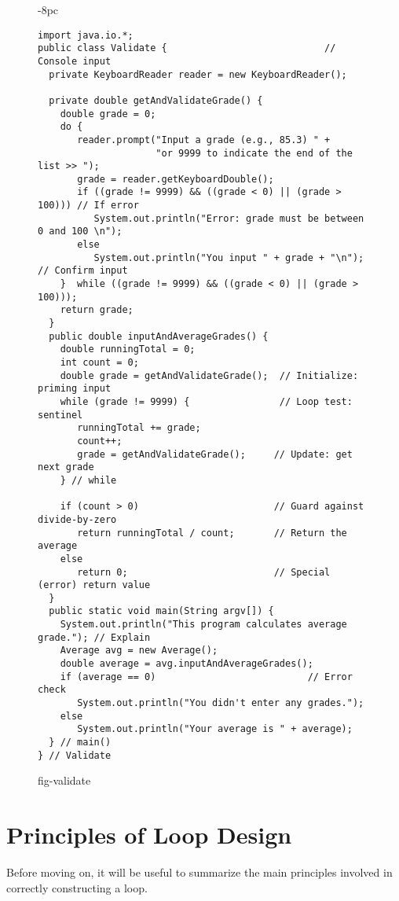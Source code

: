 \begin{figure}[p]
\jjjprogstart
\begin{jjjlistingleft}[34pc]{-8pc}
\begin{lstlisting}
import java.io.*;
public class Validate {                            // Console input
  private KeyboardReader reader = new KeyboardReader();  

  private double getAndValidateGrade() {
    double grade = 0;
    do {
       reader.prompt("Input a grade (e.g., 85.3) " +
                     "or 9999 to indicate the end of the list >> ");
       grade = reader.getKeyboardDouble();
       if ((grade != 9999) && ((grade < 0) || (grade > 100))) // If error
          System.out.println("Error: grade must be between 0 and 100 \n");  
       else
          System.out.println("You input " + grade + "\n");  // Confirm input
    }  while ((grade != 9999) && ((grade < 0) || (grade > 100)));
    return grade;
  }
  public double inputAndAverageGrades() {
    double runningTotal = 0;
    int count = 0;
    double grade = getAndValidateGrade();  // Initialize: priming input
    while (grade != 9999) {                // Loop test: sentinel
       runningTotal += grade;                            
       count++;                                          
       grade = getAndValidateGrade();     // Update: get next grade
    } // while

    if (count > 0)                        // Guard against divide-by-zero
       return runningTotal / count;       // Return the average
    else
       return 0;                          // Special (error) return value
  }
  public static void main(String argv[]) {
    System.out.println("This program calculates average grade."); // Explain
    Average avg = new Average();
    double average = avg.inputAndAverageGrades();
    if (average == 0)                           // Error check
       System.out.println("You didn't enter any grades.");
    else
       System.out.println("Your average is " + average);        
  } // main()
} // Validate
\end{lstlisting}
\end{jjjlistingleft}
{fig-validate}
\end{figure}

\section{Principles of Loop Design}
\label{principlesof-loop-design}
\noindent Before moving on, it will be useful to summarize the main
principles involved in correctly
constructing a loop.

